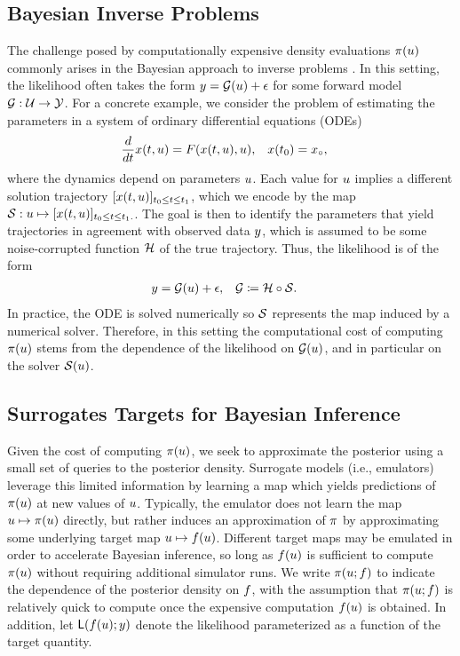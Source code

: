 \documentclass[12pt]{article}
\begin{document}
\subsection{Bayesian Inverse Problems}
The challenge posed by computationally expensive density evaluations $\pi(u)$ commonly 
arises in the Bayesian approach to inverse problems \citep{Stuart_BIP}. In this setting, 
the likelihood often takes the form $y = \mathcal{G}(u) + \epsilon$ for some forward model
$\mathcal{G}: \mathcal{U} \to \mathcal{Y}$. For a concrete example, we consider the problem of estimating the 
parameters in a system of ordinary differential equations (ODEs)
\begin{align}
\frac{d}{dt} x(t, u) &= F(x(t, u), u), &&x(t_0) = x_{\circ}, \label{ode_ivp}
\end{align}
where the dynamics depend on parameters $u$. Each value for $u$ implies a different solution trajectory
$[x(t, u)]_{t_0 \leq t \leq t_1}$, which we encode by the
map $\mathcal{S}: u \mapsto [x(t, u)]_{t_0 \leq t \leq t_1.}$. The goal is then 
to identify the parameters that yield trajectories in agreement with observed data 
$y$, which is assumed to be some noise-corrupted function $\mathcal{H}$ of the true trajectory. Thus, the 
likelihood is of the form 
\begin{align}
&y = \mathcal{G}(u) + \epsilon, &&\mathcal{G} \coloneqq \mathcal{H} \circ \mathcal{S}. \label{eq:additive-noise}
\end{align}
In practice, the ODE is solved numerically so $\mathcal{S}$ represents the map induced by a numerical 
solver. Therefore, in this setting the computational cost of computing $\pi(u)$ stems from the 
dependence of the likelihood on $\mathcal{G}(u)$, and in particular on the solver $\mathcal{S}(u)$.

\subsection{Surrogates Targets for Bayesian Inference} \label{sec:surrogates-Bayes}
Given the cost of computing $\pi(u)$, we seek to approximate
the posterior using a small set of queries to the posterior density. 
Surrogate models (i.e., emulators) leverage this limited information by 
learning a map which yields predictions of $\pi(u)$ at new values 
of $u$. Typically, the emulator does not learn the map
$u \mapsto \pi(u)$ directly, but rather induces an approximation
of $\pi$ by approximating some underlying target map 
$u \mapsto f(u)$. Different target maps may be emulated in order to
 accelerate Bayesian inference, so long as $f(u)$ is sufficient to compute 
 $\pi(u)$ without requiring additional simulator runs. We write 
 $\pi(u; f)$ to indicate the dependence of the posterior density 
 on $f$, with the assumption that $\pi(u; f)$ is relatively 
 quick to compute once the expensive computation $f(u)$ is
 obtained. In addition, let $\mathsf{L}(f(u); y)$ denote the likelihood parameterized
 as a function of the target quantity. 
 
\end{document}

